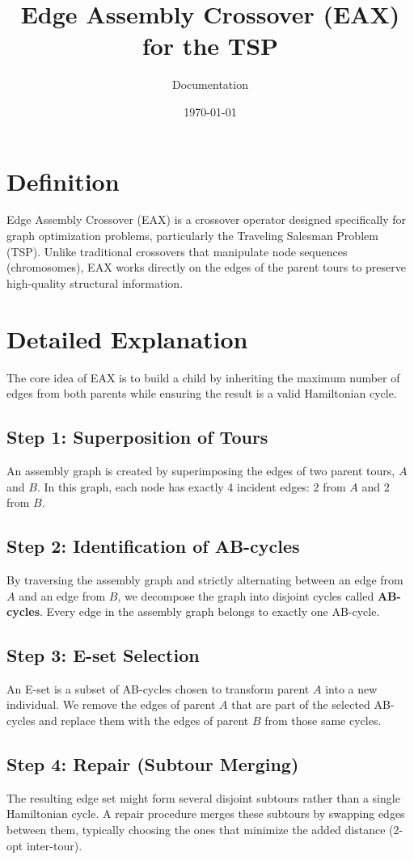 \documentclass{article}
\title{Edge Assembly Crossover (EAX) for the TSP}
\author{Documentation}
\date{\today}
\begin{document}
\maketitle

\section{Definition}
Edge Assembly Crossover (EAX) is a crossover operator designed specifically for graph optimization problems, particularly the Traveling Salesman Problem (TSP). Unlike traditional crossovers that manipulate node sequences (chromosomes), EAX works directly on the edges of the parent tours to preserve high-quality structural information.

\section{Detailed Explanation}
The core idea of EAX is to build a child by inheriting the maximum number of edges from both parents while ensuring the result is a valid Hamiltonian cycle.

\subsection{Step 1: Superposition of Tours}
An assembly graph is created by superimposing the edges of two parent tours, $A$ and $B$. In this graph, each node has exactly 4 incident edges: 2 from $A$ and 2 from $B$.

\subsection{Step 2: Identification of AB-cycles}
By traversing the assembly graph and strictly alternating between an edge from $A$ and an edge from $B$, we decompose the graph into disjoint cycles called \textbf{AB-cycles}. Every edge in the assembly graph belongs to exactly one AB-cycle.

\subsection{Step 3: E-set Selection}
An E-set is a subset of AB-cycles chosen to transform parent $A$ into a new individual. We remove the edges of parent $A$ that are part of the selected AB-cycles and replace them with the edges of parent $B$ from those same cycles.

\subsection{Step 4: Repair (Subtour Merging)}
The resulting edge set might form several disjoint subtours rather than a single Hamiltonian cycle. A repair procedure merges these subtours by swapping edges between them, typically choosing the ones that minimize the added distance (2-opt inter-tour).
\end{document}
